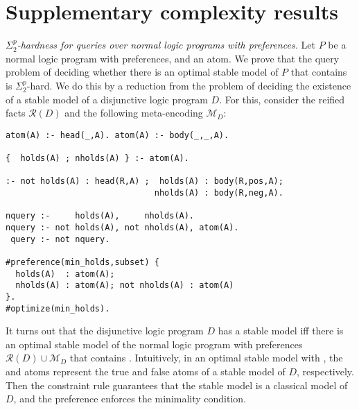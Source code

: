 \section{Supplementary complexity results} \label{sec:complexity}

\emph{$\Sigma^p_2$-hardness for queries over normal logic programs with preferences.}
%  
Let $P$ be a normal logic program with preferences, and  an atom. 
%
We prove that the query problem of deciding whether 
there is an optimal stable model of $P$ that contains  is $\Sigma^p_2$-hard.
%
We do this by a reduction from the problem of deciding 
the existence of a stable model of a disjunctive logic program $D$.
%
For this, consider the reified facts $\mathcal{R}(D)$ and the following meta-encoding $\mathcal{M}_D$:
\begin{lstlisting}
atom(A) :- head(_,A). atom(A) :- body(_,_,A).

{  holds(A) ; nholds(A) } :- atom(A).

:- not holds(A) : head(R,A) ;  holds(A) : body(R,pos,A); 
                              nholds(A) : body(R,neg,A).

nquery :-     holds(A),     nholds(A).
nquery :- not holds(A), not nholds(A), atom(A).
 query :- not nquery.

#preference(min_holds,subset) {
  holds(A)  : atom(A);
  nholds(A) : atom(A); not nholds(A) : atom(A)
}.
#optimize(min_holds).
\end{lstlisting}
It turns out that the disjunctive logic program $D$ has a stable model iff 
there is an optimal stable model of the normal logic program with preferences 
$\mathcal{R}(D) \cup \mathcal{M}_D$ that contains .
%
Intuitively, in an optimal stable model with , 
the  and  atoms
represent the true and false atoms of a stable model of $D$, respectively.
%
Then the constraint rule guarantees that the stable model is a classical model of $D$, 
and the preference  enforces the minimality condition.


